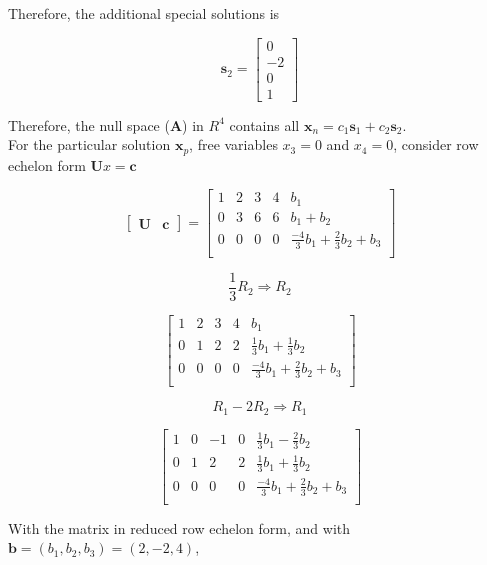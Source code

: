 \documentclass[main.tex]{subfiles}
\begin{document}
\begin{enumerate}
\begin{enumerate}
        Therefore, the additional special solutions is 
        
        $$\textbf{s}_2=\left[\begin{array}{c}0 \\ -2 \\ 0 \\ 1\end{array}\right]$$
        
        Therefore, the null space  (\textbf{A}) in $R^4$ contains all $\textbf{x}_n=c_1 \textbf{s}_1+c_2 \textbf{s}_2$.\\ 
        
        For the particular solution $\textbf{x}_p$, free variables $x_3=0$ and $x_4=0$, consider row echelon form $\textbf{U} x=\textbf{c}$

        $$
        \left[\begin{array}{ll} \textbf{U} & \textbf{c} \end{array}\right] =
        \begin{bmatrix} 
    	1 & 2 & 3 & 4 & b_1\\
    	0 & 3 & 6 & 6 & b_1 + b_2 \\
    	0 & 0 & 0 & 0 & \frac{-4}{3}b_1 + \frac{2}{3}b_2 + b_3 \\
        \end{bmatrix}
        $$

        $$\frac{1}{3} R_2 \Rightarrow R_2$$  

        $$
        \begin{bmatrix} 
    	1 & 2 & 3 & 4 & b_1\\
    	0 & 1 & 2 & 2 & \frac{1}{3}b_1 + \frac{1}{3}b_2 \\
    	0 & 0 & 0 & 0 & \frac{-4}{3}b_1 + \frac{2}{3}b_2 + b_3 \\
        \end{bmatrix}
        $$

        $$R_1 - 2R_2 \Rightarrow R_1$$ 

        $$
        \begin{bmatrix} 
    	1 & 0 & -1 & 0 & \frac{1}{3}b_1 - \frac{2}{3}b_2 \\
    	0 & 1 & 2 & 2 & \frac{1}{3}b_1 + \frac{1}{3}b_2 \\
    	0 & 0 & 0 & 0 & \frac{-4}{3}b_1 + \frac{2}{3}b_2 + b_3 \\
        \end{bmatrix}
        $$

        With the matrix in reduced row echelon form, and with $\textbf{b}=\left(b_1, b_2, b_3\right)=(2,-2,4)$, 


\end{enumerate}
\end{enumerate}
\end{document}
